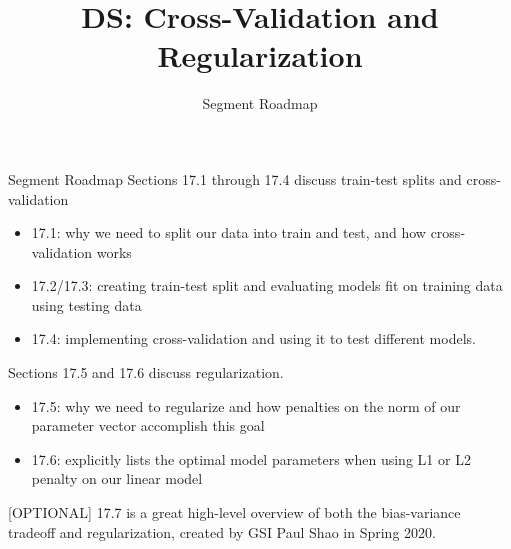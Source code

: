 \documentclass[aspectratio=169]{../latex_main/tntbeamer}  %
\title[Introduction]{DS: Cross-Validation and Regularization}
\subtitle{Segment Roadmap}
\begin{document}
	
	\maketitle
	\begin{frame}{Segment Roadmap}
	    Sections 17.1 through 17.4 discuss train-test splits and cross-validation
	    \begin{itemize}
	        \item 17.1: why we need to split our data into train and test, and how cross-validation works
	        \item 17.2/17.3: creating train-test split and evaluating models fit on training data using testing data
	        \item 17.4: implementing cross-validation and using it to test different models.
	    \end{itemize}
	    Sections 17.5 and 17.6 discuss regularization.
	    \begin{itemize}
	        \item 17.5: why we need to regularize and how penalties on the norm of our parameter vector accomplish this goal
	        \item 17.6: explicitly lists the optimal model parameters when using L1 or L2 penalty on our linear model
	    \end{itemize}
	    [OPTIONAL] 17.7 is a great high-level overview of both the bias-variance tradeoff and regularization, created by GSI Paul Shao in Spring 2020.
	\end{frame}
	
	
\end{document}
